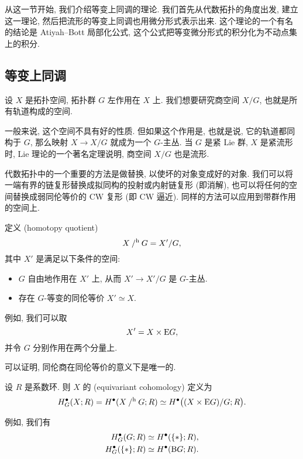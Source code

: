 从这一节开始, 我们介绍等变上同调的理论.
我们首先从代数拓扑的角度出发, 建立这一理论,
然后把流形的等变上同调也用微分形式表示出来.
这个理论的一个有名的结论是 Atiyah--Bott 局部化公式,
这个公式把等变微分形式的积分化为不动点集上的积分.


\subsection{等变上同调}

设 $X$ 是拓扑空间, 拓扑群 $G$ 左作用在 $X$ 上.
我们想要研究商空间 $X / G$, 也就是所有轨道构成的空间.

一般来说, 这个空间不具有好的性质.
但如果这个作用是, 也就是说, 它的轨道都同构于 $G$,
那么映射 $X \to X / G$ 就成为一个 $G$-主丛.
当 $G$ 是紧 Lie 群, $X$ 是紧流形时,
Lie 理论的一个著名定理说明, 商空间 $X / G$ 也是流形.

代数拓扑中的一个重要的方法是做替换, 以使坏的对象变成好的对象.
我们可以将一端有界的链复形替换成拟同构的投射或内射链复形 (即消解),
也可以将任何的空间替换成弱同伦等价的 CW 复形 (即 CW 逼近).
同样的方法可以应用到带群作用的空间上.

\begin{definition}
    定义 (homotopy quotient)
    \[ X \mathbin{/^{\mathrm{h}}} G = X' / G, \]
    其中 $X'$ 是满足以下条件的空间:
    \begin{itemize}
        \item
            $G$ 自由地作用在 $X'$ 上, 从而 $X' \to X'/G$ 是 $G$-主丛.
        \item
            存在 $G$-等变的同伦等价 $X' \simeq X$.
    \end{itemize}
\end{definition}

例如, 我们可以取
\[ X' = X \times \mathrm{E} G, \]
并令 $G$ 分别作用在两个分量上.

可以证明, 同伦商在同伦等价的意义下是唯一的.

\begin{definition}
    设 $R$ 是系数环. 则 $X$ 的 (equivariant cohomology) 定义为
    \[ H_G^\bullet (X; R) = H^\bullet (X \mathbin{/^{\mathrm{h}}} G; R)
        \simeq H^\bullet \bigl( (X \times \mathrm{E} G) / G; R \bigr). \]
\end{definition}

例如, 我们有
\begin{align*}
    H_G^\bullet (G; R) & \simeq H^\bullet (\{*\}; R), \\
    H_G^\bullet (\{*\}; R) & \simeq H^\bullet (\mathrm{B} G; R).
\end{align*}

